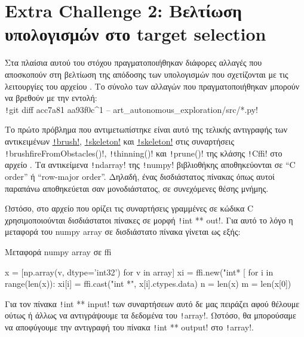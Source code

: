 \section{Extra Challenge 2: Βελτίωση υπολογισμών στο target selection}
Στα πλαίσια αυτού του στόχου πραγματοποιήθηκαν διάφορες αλλαγές που αποσκοπούν στη βελτίωση της απόδοσης των υπολογισμών που σχετίζονται με τις λειτουργίες του αρχείου
.
Το σύνολο των αλλαγών που πραγματοποιήθηκαν μπορούν να βρεθούν με την εντολή:\\
\texttt!git diff acc7a81 aa93f0c^1 -- art_autonomous_exploration/src/*.py!

Το πρώτο πρόβλημα που αντιμετωπίστηκε είναι αυτό της τελικής αντιγραφής των
αντικειμένων
\href{https://github.com/etsardou/intelligent_robot_systems_2016/blob/bc7bfee96e5598edc83a6bcadaaef982c2a398aa/art_autonomous_exploration/src/utilities.py#L44}{\texttt!brush!},
\href{https://github.com/etsardou/intelligent_robot_systems_2016/blob/bc7bfee96e5598edc83a6bcadaaef982c2a398aa/art_autonomous_exploration/src/utilities.py#L67}{\texttt!skeleton!} και
\href{https://github.com/etsardou/intelligent_robot_systems_2016/blob/bc7bfee96e5598edc83a6bcadaaef982c2a398aa/art_autonomous_exploration/src/utilities.py#L91}{\texttt!skeleton!}
στις συναρτήσεις
\texttt!brushfireFromObstacles()!,
\texttt!thinning()! και
\texttt!prune()!
της κλάσης
\texttt!Cffi!
στο αρχείο
.
Τα αντικείμενα \texttt!ndarray! της \texttt!numpy! βιβλιοθήκης αποθηκεύονται σε ``C order'' ή ``row-major order''.
Δηλαδή, ένας δισδιάστατος πίνακας όπως αυτοί παραπάνω αποθηκεύεται σαν μονοδιάστατος, σε συνεχόμενες θέσης μνήμης.

\sloppy Ωστόσο, στο αρχείο
που ορίζει τις συναρτήσεις γραμμένες σε κώδικα C χρησιμοποιούνται δισδιάστατοι πίνακες σε μορφή \texttt!int ** out!.
Για αυτό το λόγο η μεταφορά του numpy array σε δισδιάστατο πίνακα γίνεται ως εξής:
\begin{code}
\caption{Μεταφορά numpy array σε ffi}
\begin{pythoncode}
x = [np.array(v, dtype='int32') for v in array]
xi = ffi.new("int* [%
for i in range(len(x)):
    xi[i] = ffi.cast("int *", x[i].ctypes.data)
n = len(x)
m = len(x[0])
\end{pythoncode}
\end{code}
Για τον πίνακα \texttt!int ** input! των συναρτήσεων αυτό δε μας πειράζει αφού θέλουμε ούτως ή άλλως να αντιγράψουμε τα δεδομένα του \texttt!array!.
Ωστόσο, θα μπορούσαμε να αποφύγουμε την αντιγραφή του πίνακα \texttt!int ** output! στο \texttt!array!.

